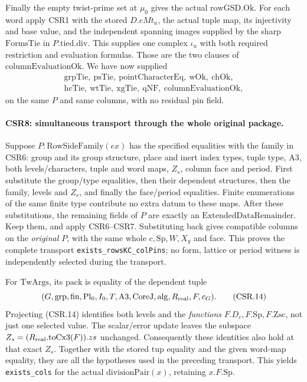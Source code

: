 Finally the empty twist-prime set at \(\mu_0\) gives the actual
\(\mathrm{rowGSD.Ok}\). For each word apply CSR1 with the stored
\(D.eMt_u\), the actual tuple map, its injectivity and base value,
and the independent spanning images supplied by
the sharp \(\mathrm{FormsTie}\) in \(P.\mathrm{tied.div}\).
This supplies one complex \(\iota_u\) with both required
restriction and evaluation formulas. Those are the two clauses
of \(\mathrm{columnEvaluationOk}\). We have now supplied
\[
 \begin{gathered}
 \mathrm{grpTie,\ psTie,\ pointCharacterEq,\ wOk,\ chOk},\\
 \mathrm{hcTie,\ wtTie,\ xgTie,\ qNF,\ columnEvaluationOk},
 \end{gathered}
\]
on the same \(P\) and same
columns, with no residual pin field.

\paragraph{CSR8: simultaneous transport through the whole original package.}
\label{claim:CSR8}
Suppose \(P:\mathrm{RowSideFamily}(ex)\) has the specified
equalities with the family in CSR6: group and its group structure,
place and inert index types, tuple type, \(\mathrm{A3}\), both
levels/characters, tuple and word maps, \(Z_s\), column face and
period. First substitute the group/type equalities, then their
dependent structures, then the family, levels and \(Z_s\),
and finally the face/period equalities. Finite enumerations of
the same finite type contribute no extra datum to these maps.
After these substitutions, the remaining fields of \(P\) are
exactly an \(\mathrm{ExtendedDataRemainder}\). Keep them, and
apply CSR6--CSR7. Substituting back gives compatible columns on
the \emph{original \(P\)}, with the same whole \(c,\mathrm{Sp},W,
X_g\) and face. This proves the complete transport
\texttt{exists\_rowsKC\_colPins}; no form, lattice or period
witness is independently selected during the transport.

For \(\mathrm{TwArgs}\), its \(\mathrm{pack}\) is equality of the
dependent tuple
\[
 (G,\mathrm{grp},\mathrm{fin},\mathrm{Pl}_0,I_0,T,\mathrm{A3},
    \mathrm{CoreJ},\mathrm{alg},R_{\rm real},F,c_G).
 \tag{CSR.14}
\]
Projecting (CSR.14) identifies both levels and the \emph{functions}
\(F.D_c,F.\mathrm{Sp},F.\mathrm{Zsc}\), not just one selected
value. The scalar/error update leaves the subspace
\(Z_s=(R_{\rm real}.\mathrm{toCx3}(F)).zs\) unchanged.
Consequently these identities also hold at that exact \(Z_s\).
Together with the stored \(\mathrm{tup}\) equality and the given
word-map equality, they are all the hypotheses used in the
preceding transport. This yields \texttt{exists\_cols} for the
actual \(\mathrm{divisionPair}(x)\), retaining \(x.F.\mathrm{Sp}\).

